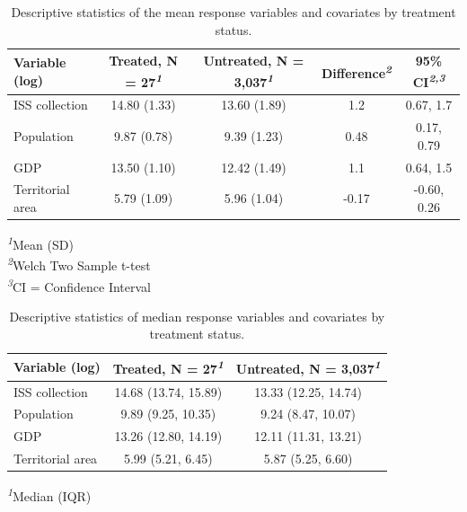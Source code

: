 \documentclass[12pt, a4paper, twoside]{article}
\numberwithin{equation}{subsection} %
\begin{document}
\hypertarget{tbl-descriptive-mean}{}
\begingroup
\fontsize{9.0pt}{10.8pt}\selectfont
\setlength{\LTpost}{0mm}
\begin{longtable}{lcccc}
\caption{\label{tbl-descriptive-mean}Descriptive statistics of the mean response variables and covariates by
treatment status. }\tabularnewline

\toprule
\textbf{Variable (log)} & \textbf{Treated}, N = 27\textsuperscript{\textit{1}} & \textbf{Untreated}, N = 3,037\textsuperscript{\textit{1}} & \textbf{Difference}\textsuperscript{\textit{2}} & \textbf{95\% CI}\textsuperscript{\textit{2,3}} \\ 
\midrule\addlinespace[2.5pt]
ISS collection & 14.80 (1.33) & 13.60 (1.89) & 1.2 & 0.67, 1.7 \\ 
Population & 9.87 (0.78) & 9.39 (1.23) & 0.48 & 0.17, 0.79 \\ 
GDP & 13.50 (1.10) & 12.42 (1.49) & 1.1 & 0.64, 1.5 \\ 
Territorial area & 5.79 (1.09) & 5.96 (1.04) & -0.17 & -0.60, 0.26 \\ 
\bottomrule
\end{longtable}
\begin{minipage}{\linewidth}
\textsuperscript{\textit{1}}Mean (SD)\\
\textsuperscript{\textit{2}}Welch Two Sample t-test\\
\textsuperscript{\textit{3}}CI = Confidence Interval\\
\end{minipage}
\endgroup

\hypertarget{tbl-descriptive-median}{}
\begingroup
\fontsize{9.0pt}{10.8pt}\selectfont
\setlength{\LTpost}{0mm}
\begin{longtable}{lcc}
\caption{\label{tbl-descriptive-median}Descriptive statistics of median response variables and covariates by
treatment status. }\tabularnewline

\toprule
\textbf{Variable (log)} & \textbf{Treated}, N = 27\textsuperscript{\textit{1}} & \textbf{Untreated}, N = 3,037\textsuperscript{\textit{1}} \\ 
\midrule\addlinespace[2.5pt]
ISS collection & 14.68 (13.74, 15.89) & 13.33 (12.25, 14.74) \\ 
Population & 9.89 (9.25, 10.35) & 9.24 (8.47, 10.07) \\ 
GDP & 13.26 (12.80, 14.19) & 12.11 (11.31, 13.21) \\ 
Territorial area & 5.99 (5.21, 6.45) & 5.87 (5.25, 6.60) \\ 
\bottomrule
\end{longtable}
\begin{minipage}{\linewidth}
\textsuperscript{\textit{1}}Median (IQR)\\
\end{minipage}
\endgroup
\end{document}
